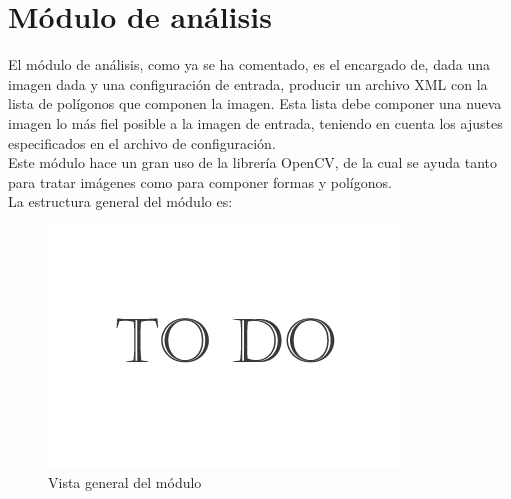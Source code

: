 \section{Módulo de análisis}



El módulo de análisis, como ya se ha comentado, es el encargado de, dada una imagen dada y una configuración de entrada, producir un archivo XML con la lista de polígonos que componen la imagen. Esta lista debe componer una nueva imagen lo más fiel posible a la imagen de entrada, teniendo en cuenta los ajustes especificados en el archivo de configuración.\\

Este módulo hace un gran uso de la librería OpenCV, de la cual se ayuda tanto para tratar imágenes como para componer formas y polígonos.\\

La estructura general del módulo es:\\

		\begin{figure}[htbp]
		\centering
		\includegraphics[scale=0.47]{graphics/todo.png}
		\caption{Vista general del módulo}
		\label{fig:diagramageneralPHIC}
		\end{figure}
		
